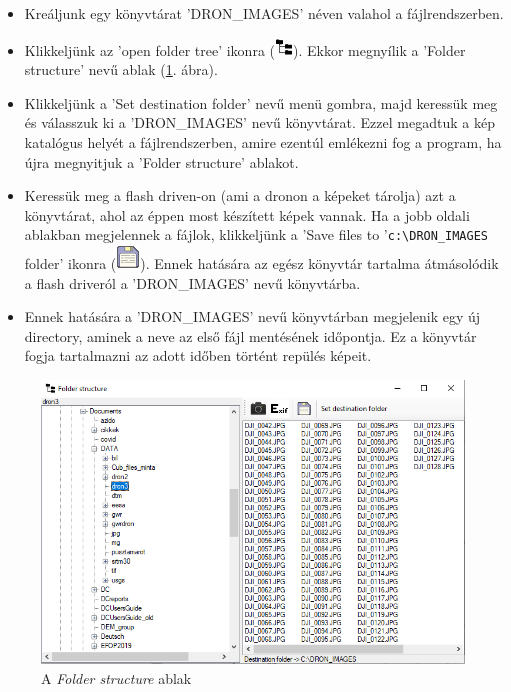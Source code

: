 \documentclass[a4paper,12pt]{book}
\begin{document}
\begin{itemize}
	\item Kreáljunk egy könyvtárat 'DRON\_IMAGES' néven valahol a fájlrendszerben.
	
	\item Klikkeljünk az 'open folder tree' ikonra (\includegraphics{open_folder_structure.png}). Ekkor megnyílik a 'Folder structure' nevű ablak (\ref{fig:folder_struc}. ábra).
	
	\item Klikkeljünk a 'Set destination folder' nevű menü gombra, majd keressük meg és válasszuk ki a 'DRON\_IMAGES' nevű könyvtárat. Ezzel megadtuk a kép katalógus helyét a fájlrendszerben, amire ezentúl emlékezni fog a program, ha újra megnyitjuk a 'Folder structure' ablakot. 
	
	\item Keressük meg a flash driven-on (ami a dronon a képeket tárolja) azt a könyvtárat, ahol az éppen most készített képek vannak. Ha a jobb oldali ablakban megjelennek a fájlok, klikkeljünk a 'Save files to '\verb|c:\DRON_IMAGES| folder' ikonra (\includegraphics{save.png}). Ennek hatására az egész könyvtár tartalma átmásolódik a flash driveról a 'DRON\_IMAGES' nevű könyvtárba.
	
	\item Ennek hatására a 'DRON\_IMAGES' nevű könyvtárban megjelenik egy új directory, aminek a neve az első fájl mentésének időpontja. Ez a könyvtár fogja tartalmazni az adott időben történt repülés képeit.
\end{itemize}

\begin{figure}
	\centering
	\includegraphics[width=13cm]{folder_struc.png}
	\caption{A \textit{Folder structure} ablak}
	\label{fig:folder_struc}
\end{figure}
\end{document}
